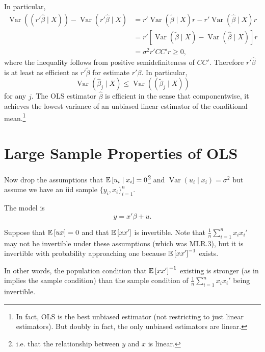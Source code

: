 \begin{remark}
	In particular,
	\begin{align*}
		\operatorname{Var}\left(\left( r' \hat{\beta} \mid X \right)\right) - \operatorname{Var}\left( r' \hat{\beta} \mid X\right) &=  r' \operatorname{Var}\left(\tilde{\beta} \mid X\right)r - r' \operatorname{Var}\left(\hat{\beta} \mid X\right)r \\
		&= r' \left[ \operatorname{Var}\left(\tilde{\beta }\mid X\right) - \operatorname{Var}\left(\hat{\beta} \mid X\right) \right]r \\
		&= \sigma^2 r' C C' r \ge 0
	,\end{align*}
	where the inequality follows from positive semidefiniteness of $C C'$. Therefore $r' \hat{\beta}$ is at least as efficient as $r' \tilde{\beta}$ for estimate $r' \beta$.
	In particular, \[
		\operatorname{Var}\left(\hat{\beta}_j \mid X\right) \le \operatorname{Var}\left( \left( \tilde{\beta}_j \mid X \right)\right)
	\] for any $j$. The OLS estimator $\hat{\beta}$ is efficient in the sense that componentwise, it achieves the lowest variance of an unbiased linear estimator of the conditional mean.\footnote{In fact, OLS is the best unbiased estimator (not restricting to just linear estimators). But doubly in fact, the only unbiased estimators are linear.}
\end{remark}


\section{Large Sample Properties of OLS}

\begin{assumption}	Now drop the assumptions that $\mathbb{E}\left[u_i \mid x_i\right] = 0$\footnote{i.e. that the relationship between $y$ and $x$ is linear.} and $\operatorname{Var}(u_i \mid x_i) = \sigma^2$ but assume we have an iid sample $\{y_i, x_i\}_{i=1}^n$.
	
	The model is \[
		y = x'\beta + u
	.\] 
	
	Suppose that $\mathbb{E}\left[ux\right] = 0$ and that $\mathbb{E}\left[xx'\right] $ is invertible. Note that $\frac{1}{n} \sum_{i=1}^{n} x_i x_i'$ may not be invertible under these assumptions (which was MLR.3), but it is invertible with probability approaching one because $\mathbb{E}\left[xx'\right] ^{-1}$ exists.
	
	In other words, the population condition that $\mathbb{E}\left[x x'\right]^{-1}$ existing is stronger (as in implies the sample condition) than the sample condition of $\frac{1}{n}\sum_{i=1}^{n} x_i x_i'$ being invertible.
\end{assumption}

